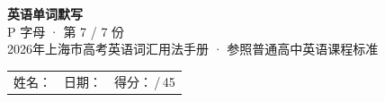 \documentclass[10pt,a4paper]{article}
\begin{document}
\pagestyle{plain}

\begin{center}
{\LARGE\bfseries 英语单词默写}\\[0.22em]
{\large P 字母 · 第 7 / 7 份}\\[0.18em]
{\small 2026年上海市高考英语词汇用法手册 · 参照普通高中英语课程标准}
\end{center}

\vspace{0.25em}
\noindent\begin{tabular}{@{}p{}@{}p{}@{}p{}@{}}
姓名：\underline{\hspace{2.0cm}} & 日期：\underline{\hspace{2.0cm}} & 得分：\underline{\hspace{1.3cm}}\,/\,45 \\
\end{tabular}

\vspace{0.3em}

\vspace{0.08em}
\end{document}
